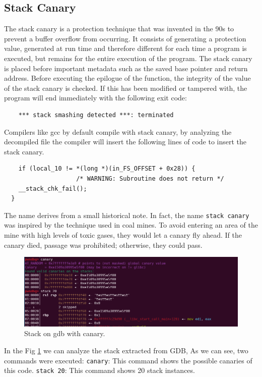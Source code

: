     \subsection{Stack Canary}
    The stack canary is a protection technique that was invented in the 90s to prevent a buffer overflow from occurring.\newline
    It consists of generating a protection value, generated at run time and therefore different for each time a program is executed, but remains for the entire execution of the program.\newline
    The stack canary is placed before important metadata such as the saved base pointer and return address.\newline
    Before executing the epilogue of the function, the integrity of the value of the stack canary is checked.\newline
    If this has been modified or tampered with, the program will end immediately with the following exit code:
    \begin{verbatim}
    *** stack smashing detected ***: terminated
    \end{verbatim}
    Compilers like gcc by default compile with stack canary, by analyzing the decompiled file the compiler will insert the following lines of code to insert the stack canary.\newline
    \begin{verbatim}
    if (local_10 != *(long *)(in_FS_OFFSET + 0x28)) {
                    /* WARNING: Subroutine does not return */
    __stack_chk_fail();
  }
    \end{verbatim}
    
    The name derives from a small historical note. In fact, the name \texttt{stack canary} was inspired by the technique used in coal mines.\newline
    To avoid entering an area of the mine with high levels of toxic gases, they would let a canary fly ahead.\newline
    If the canary died, passage was prohibited; otherwise, they could pass.
    \clearpage
    
    \begin{figure}[htbp]
        \centering
        \includegraphics[width=1\linewidth]{Images/photo_of_the_stack_with_canary.png}
        \caption{Stack on gdb with canary.}
        \label{fig:canaryongdb}
    \end{figure}
    In the Fig \ref{fig:canaryongdb} we can analyze the stack extracted from GDB, As we can see, two commands were executed:\newline
    \texttt{canary}: This command shows the possible canaries of this code.\newline
    \texttt{stack 20}: This command shows 20 stack instances.
    
